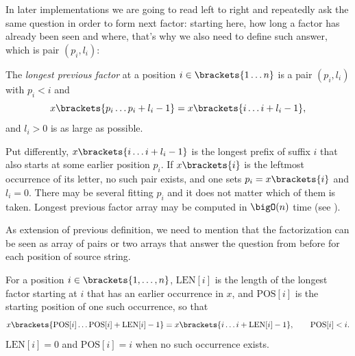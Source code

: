 In later implementations we are going to read  left to right and repeatedly ask the same question in order to form next factor: starting here, how long a factor has already been seen and where, that's why we also need to define such answer, which is pair \((p_i, l_i)\): 

\begin{definition}
\label{def:lpf}
    The \emph{longest previous factor} at a position \(i \in \brackets{1 \ldots n}\) is a pair \((p_i, l_i)\) with \(p_i < i\) and
    \[
        x\brackets{p_i \ldots p_i + l_i - 1} = x\brackets{i \ldots i + l_i - 1},
    \]
    and \(l_i > 0\) is as large as possible.
\end{definition}
\noindent Put differently, \(x\brackets{i \ldots i + l_i - 1}\) is the longest prefix of suffix \(i\) that also starts at some earlier position \(p_i\). If \(x\brackets{i}\) is the leftmost occurrence of its letter, no such pair exists, and one sets \(p_i = x\brackets{i}\) and \(l_i = 0\). There may be several fitting \(p_i\) and it does not matter which of them is taken. Longest previous factor array may be computed in \(\bigO(n)\) time (see \cite{kasai2001}).


As extension of previous definition, we need to mention that the factorization can be seen as array of pairs or two arrays that answer the question from before for each position of source string.  
\begin{definition}
\label{def:pos-len}
    For a position \(i \in \brackets{1, \ldots, n}\), \(\mathrm{LEN}[i]\) is the length of the
    longest factor starting at \(i\) that has an earlier occurrence in \(x\), and
    \(\mathrm{POS}[i]\) is the starting position of one such occurrence, so that
    \[
      x\brackets{\mathrm{POS}[i] \ldots \mathrm{POS}[i] + \mathrm{LEN}[i] - 1}
      = x\brackets{i \ldots i + \mathrm{LEN}[i] - 1},
      \qquad \mathrm{POS}[i] < i .
    \]
    \(\mathrm{LEN}[i] = 0\) and \(\mathrm{POS}[i] = i\) when no such occurrence exists.
\end{definition}


